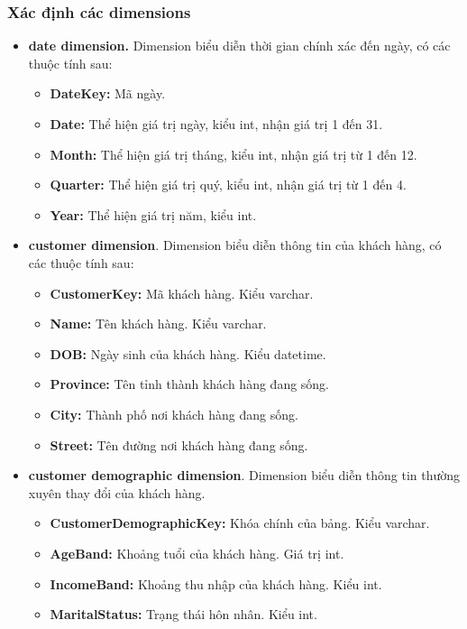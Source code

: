 \documentclass{article}
\begin{document}
\subsubsection{Xác định các dimensions}
\begin{itemize}
    \item \textbf{date dimension.} Dimension biểu diễn thời gian chính xác đến ngày, có các thuộc tính sau:
    \begin{itemize}
        \item \textbf{DateKey:} Mã ngày.
        \item \textbf{Date:} Thể hiện giá trị ngày, kiểu int, nhận giá trị 1 đến 31.
        \item \textbf{Month:} Thể hiện giá trị tháng, kiểu int, nhận giá trị từ 1 đến 12.
        \item \textbf{Quarter:} Thể hiện giá trị quý, kiểu int, nhận giá trị từ 1 đến 4.
        \item \textbf{Year:} Thể hiện giá trị năm, kiểu int.
    \end{itemize}
    \item \textbf{customer dimension}. Dimension biểu diễn thông tin của khách hàng, có các thuộc tính sau:
    \begin{itemize}
        \item \textbf{CustomerKey:} Mã khách hàng. Kiểu varchar.
        \item \textbf{Name:} Tên khách hàng. Kiểu varchar.
        \item \textbf{DOB:} Ngày sinh của khách hàng. Kiểu datetime.
        \item \textbf{Province:} Tên tỉnh thành khách hàng đang sống.
        \item \textbf{City:} Thành phố nơi khách hàng đang sống.
        \item \textbf{Street:} Tên đường nơi khách hàng đang sống.
    \end{itemize}
    \item \textbf{customer demographic dimension}. Dimension biểu diễn thông tin thường xuyên thay đổi của khách hàng. 
    \begin{itemize}
        \item \textbf{CustomerDemographicKey:} Khóa chính của bảng. Kiểu varchar.
        \item \textbf{AgeBand:} Khoảng tuổi của khách hàng. Giá trị int. 
        \item \textbf{IncomeBand:} Khoảng thu nhập của khách hàng. Kiểu int.
        \item \textbf{MaritalStatus:} Trạng thái hôn nhân. Kiểu int.

\end{itemize}
\end{itemize}
\end{document}
